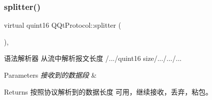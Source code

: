 \subsubsection{\texorpdfstring{splitter()}{splitter()}}
{\footnotesize\ttfamily virtual quint16 Q\+Qt\+Protocol\+::splitter (\begin{DoxyParamCaption}\item[{const Q\+Byte\+Array \&}]{ }\end{DoxyParamCaption})\hspace{0.3cm}{\ttfamily [inline]}, {\ttfamily [virtual]}}



语法解析器 从流中解析报文长度 /.../quint16 size/.../.../... 


\begin{DoxyParams}{Parameters}
{\em 接收到的数据段} & \\
\hline
\end{DoxyParams}
\begin{DoxyReturn}{Returns}
按照协议解析到的数据长度 可用，继续接收，丢弃，粘包。 
\end{DoxyReturn}


